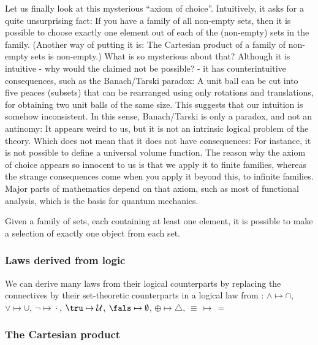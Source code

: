 Let us finally look at this mysterious ``axiom of choice''. Intuitively, it asks for a quite unsurprising fact: 
If you have a family of all non-empty sets, then it is possible to choose exactly one element out of each of the (non-empty) sets in the family. 
(Another way of putting it is: The Cartesian product of a family of non-empty sets is non-empty.) 
What is so mysterious about that? Although it is intuitive - why would the claimed not be possible? 
- it has counterintuitive consequences, such as the Banach/Tarski paradox: 
A unit ball can be cut into five peaces (subsets) that can be rearranged using only rotations and translations, for obtaining two unit balls of the same size. 
This suggests that our intuition is somehow inconsistent. In this sense, Banach/Tarski is only a paradox, and not an antinomy: 
It appears weird to us, but it is not an intrinsic logical problem of the theory. Which does not mean that it does not have consequences: 
For instance, it is not possible to define a universal volume function. 
The reason why the axiom of choice appears so innocent to us is that we apply it to finite families, whereas the strange consequences come when you apply it beyond this, to infinite families. 
Major parts of mathematics depend on that axiom, such as most of functional analysis, which is the basis for quantum mechanics.
\begin{axiom}[Choice]\label{ax:choice}
Given a family of sets, each containing at least one element, it is possible to make a selection of exactly one object from each set.
\end{axiom}

\subsubsection{Laws derived from logic}\label{subsubsec:logical-laws}

We can derive many laws from their logical counterparts by replacing the connectives by their set-theoretic counterparts in a logical law from :
$\land\mapsto\cap$, $\lor\mapsto\cup$, $\neg \mapsto \overline{\cdot}$, $\tru \mapsto \mathcal{U}$, $\fals \mapsto \emptyset$, $\oplus\mapsto\triangle$, $\equiv \, \mapsto \, =$

\subsubsection{The Cartesian product}\label{subsubsec:cartesian-product}

